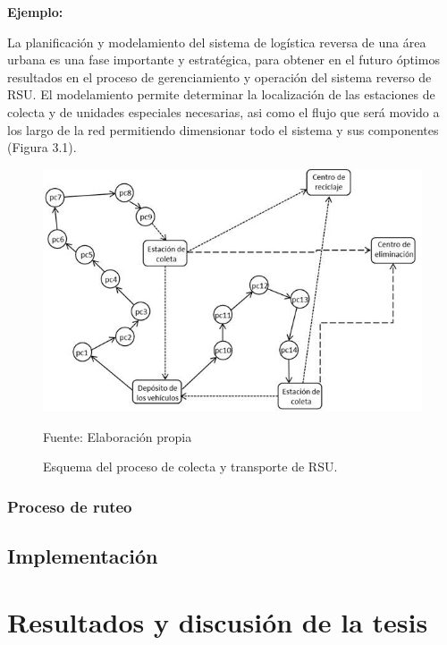 {\bf Ejemplo:}\par

La planificación y modelamiento del sistema de logística reversa de una área urbana es una fase importante y estratégica, para obtener en el futuro óptimos resultados en el proceso de gerenciamiento y operación del sistema reverso de RSU. El modelamiento permite determinar la localización de las estaciones de colecta y de unidades especiales necesarias, asi como el flujo que será movido a los largo de la red permitiendo dimensionar todo el sistema y sus componentes (Figura 3.1).
\vskip 0.3cm
\begin{figure}[ht]
\begin{center}
\includegraphics[width=.6\textwidth]{Figura3}
\end{center}
\begin{center}
\vskip -0.5cm
\caption{\small{Esquema del proceso de colecta y transporte de RSU.}}
{\small{Fuente: Elaboración propia}}
\end{center}
\end{figure}

\subsection{Proceso de ruteo}

\section{Implementación} 
























\chapter{Resultados y discusión de la tesis}


